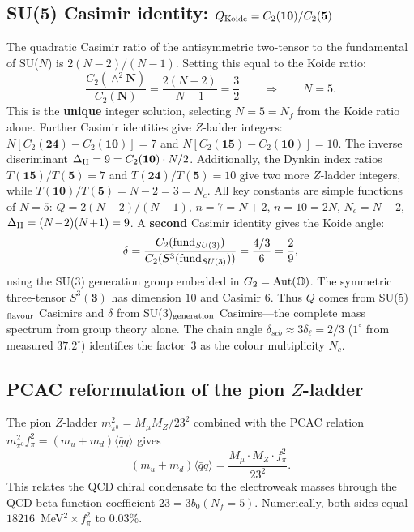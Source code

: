 \documentclass[11pt]{article}
\begin{document}
\subsection{SU(5) Casimir identity: $Q_{\rm Koide} = C_2(\mathbf{10})/C_2(\mathbf{5})$}

The quadratic Casimir ratio of the antisymmetric two-tensor
to the fundamental of SU($N$) is $2(N-2)/(N-1)$.  Setting this
equal to the Koide ratio:
\begin{equation}
  \frac{C_2(\wedge^2\mathbf{N})}{C_2(\mathbf{N})}
  = \frac{2(N-2)}{N-1} = \frac{3}{2}
  \qquad\Longrightarrow\qquad N = 5.
\end{equation}
This is the \textbf{unique} integer solution, selecting
$N=5 = N_f$ from the Koide ratio alone.  Further Casimir
identities give $Z$-ladder integers:
$N[C_2(\mathbf{24})-C_2(\mathbf{10})] = 7$ and
$N[C_2(\mathbf{15})-C_2(\mathbf{10})] = 10$.
The inverse discriminant $\Delta_{\rm II}=9 = C_2(\mathbf{10})
\cdot N/2$.  Additionally, the Dynkin index ratios
$T(\mathbf{15})/T(\mathbf{5}) = 7$ and
$T(\mathbf{24})/T(\mathbf{5}) = 10$ give two more $Z$-ladder
integers, while $T(\mathbf{10})/T(\mathbf{5}) = N-2 = 3 = N_c$.  All key
constants are simple functions of $N=5$:
$Q = 2(N\!-\!2)/(N\!-\!1)$, $n=7 = N\!+\!2$,
$n=10 = 2N$, $N_c = N\!-\!2$,
$\Delta_{\rm II} = (N\!-\!2)(N\!+\!1) = 9$.
A \textbf{second} Casimir identity gives the Koide angle:
\begin{equation}
  \delta = \frac{C_2({\rm fund}_{SU(3)})}{C_2(S^3({\rm fund}_{SU(3)}))}
  = \frac{4/3}{6} = \frac{2}{9},
\end{equation}
using the SU(3) generation group embedded in
$G_2 = {\rm Aut}(\mathbb{O})$.  The symmetric three-tensor
$S^3(\mathbf{3})$ has dimension $10$ and Casimir $6$.
Thus $Q$ comes from SU(5)$_{\rm flavour}$ Casimirs and
$\delta$ from SU(3)$_{\rm generation}$ Casimirs---the
complete mass spectrum from group theory alone.
The chain angle $\delta_{scb} \approx 3\delta_\ell = 2/3$
($1^\circ$ from measured $37.2^\circ$) identifies the
factor~$3$ as the colour multiplicity $N_c$.

\subsection{PCAC reformulation of the pion $Z$-ladder}

The pion $Z$-ladder $m_{\pi^0}^2 = M_\mu M_Z/23^2$
combined with the PCAC relation
$m_{\pi^0}^2 f_\pi^2 = (m_u\!+\!m_d)\langle\bar qq\rangle$ gives
\begin{equation}
  (m_u\!+\!m_d)\langle\bar qq\rangle
  = \frac{M_\mu\cdot M_Z\cdot f_\pi^2}{23^2}.
\end{equation}
This relates the QCD chiral condensate to the electroweak
masses through the QCD beta function coefficient
$23 = 3b_0(N_f\!=\!5)$.  Numerically, both sides equal
$18216$~MeV$^2\times f_\pi^2$ to $0.03\%$.
\end{document}
